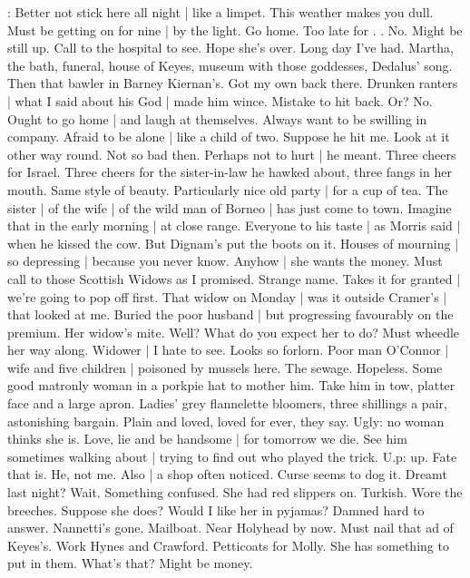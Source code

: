 \Bloom:
Better not stick here all night |
like a limpet.
This weather makes you dull.
Must be getting on for nine |
by the light.
Go home.
Too late for .
.
No.
Might be still up.
Call to the hospital to see.
Hope she's over.
Long day I've had.
Martha,
the bath,
funeral,
house of Keyes,
museum with those goddesses,
Dedalus' song.
Then that bawler in Barney Kiernan's.
Got my own back there.
Drunken ranters |
what I said about his God |
made him wince.
Mistake to hit back.
Or?
No.
Ought to go home |
and laugh at themselves.
Always want to be swilling in company.
Afraid to be alone |
like a child of two.
Suppose he hit me.
Look at it other way round.
Not so bad then.
Perhaps not to hurt |
he meant.%
Three cheers for Israel.
Three cheers for the sister-in-law he hawked about,
three fangs in her mouth.
Same style of beauty.
Particularly nice old party |
for a cup of tea.
The sister |
of the wife |
of the wild man of Borneo |
has just come to town.
Imagine that in the early morning |
at close range.
Everyone to his taste |
as Morris said |
when he kissed the cow.
But Dignam's put the boots on it.
Houses of mourning |
so depressing |
because you never know.
Anyhow |
she wants the money.
Must call to those Scottish Widows
as I promised.
Strange name.
Takes it for granted |
we're going to pop off first.
That widow on Monday |
was it outside Cramer's |
that looked at me.
Buried the poor husband |
but progressing favourably on the premium.%
Her widow's mite.
Well?
What do you expect her to do?
Must wheedle her way along.
Widower |
I hate to see.
Looks so forlorn.
Poor man O'Connor |
wife and five children |
poisoned by mussels here.
The sewage.
Hopeless.
Some good matronly woman in a porkpie hat to mother him.
Take him in tow,
platter face and a large apron.
Ladies' grey flannelette bloomers,
three shillings a pair,
astonishing bargain.
Plain and loved,
loved for ever,
they say.
Ugly:
no woman thinks she is.
Love,
lie
and be handsome |
for tomorrow we die.
See him sometimes walking about |
trying to find out who played the trick.
U.p:
up.
Fate that is.
He,
not me.
Also |
a shop often noticed.
Curse seems to dog it.
Dreamt last night?
Wait.%
Something confused.
She had red slippers on.
Turkish.
Wore the breeches.
Suppose she does?
Would I like her in pyjamas?
Damned hard to answer.
Nannetti's gone.
Mailboat.
Near Holyhead by now.
Must nail that ad of Keyes's.
Work Hynes and Crawford.
Petticoats for Molly.
She has something to put in them.
What's that?
Might be money.

